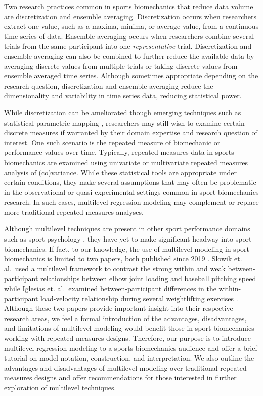 \documentclass[
]{article}
\begin{document}
Two research practices common in sports biomechanics that reduce data volume are discretization and ensemble averaging. Discretization occurs when researchers extract one value, such as a maxima, minima, or average value, from a continuous time series of data. Ensemble averaging occurs when researchers combine several trials from the same participant into one \emph{representative} trial. Discretization and ensemble averaging can also be combined to further reduce the available data by averaging discrete values from multiple trials or taking discrete values from ensemble averaged time series. Although sometimes appropriate depending on the research question, discretization and ensemble averaging reduce the dimensionality and variability in time series data, reducing statistical power.

While discretization can be ameliorated though emerging techniques such as statistical parametric mapping \cite{pataky2019}, researchers may still wish to examine certain discrete measures if warranted by their domain expertise and research question of interest. One such scenario is the repeated measure of biomechanic or performance values over time. Typically, repeated measures data in sports biomechanics are examined using univariate or multivariate repeated measures analysis of (co)variance. While these statistical tools are appropriate under certain conditions, they make several assumptions that may often be problematic in the observational or quasi-experimental settings common in sport biomechanics research. In such cases, multilevel regression modeling may complement or replace more traditional repeated measures analyses.

Although multilevel techniques are present in other sport performance domains such as sport psychology \cite{beauchamp2005,benson2016,cornelius2007}, they have yet to make significant headway into sport biomechanics. If fact, to our knowledge, the use of multilevel modeling in sport biomechanics is limited to two papers, both published since 2019 \cite{slowik2019, iglesias2021}. Slowik et. al.~used a multilevel framework to contrast the strong within and weak between-participant relationships between elbow joint loading and baseball pitching speed \cite{slowik2019} while Iglesias et. al.~examined between-participant differences in the within-participant load-velocity relationship during several weightlifting exercises \cite{iglesias2021}. Although these two papers provide important insight into their respective research areas, we feel a formal introduction of the advantages, disadvantages, and limitations of multilevel modeling would benefit those in sport biomechanics working with repeated measures designs. Therefore, our purpose is to introduce multilevel regression modeling to a sports biomechanics audience and offer a brief tutorial on model notation, construction, and interpretation. We also outline the advantages and disadvantages of multilevel modeling over traditional repeated measures designs and offer recommendations for those interested in further exploration of multilevel techniques.
\end{document}
